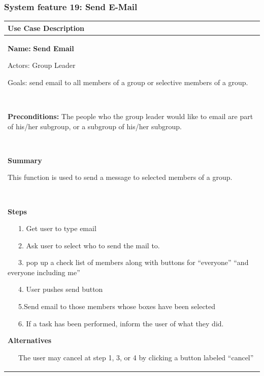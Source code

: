 \documentclass[letterpaper]{article}
\newcommand\textstyleDefaultParagraphFont[1]{#1}
\begin{document}
\subsubsection[System feature 19: Send E{}-Mail]{\rmfamily System
feature 19: Send E-Mail}
\begin{flushleft}
\tablehead{}
\begin{supertabular}{|m{6.42126in}|}
\hline
\bfseries\color{black} Use Case Description\\\hline
{\color{black} \textstyleDefaultParagraphFont{\textbf{Name:
}}\textstyleDefaultParagraphFont{\textsf{\textbf{Send Email}}}}

{\color{black} Actors: Group Leader}

{\color{black} Goals: send email to all members of a group or selective
members of a group.}

~

{\color{black} \textstyleDefaultParagraphFont{\textbf{Preconditions:}}
The people who the group leader would like to email are part of his/her
subgroup, or a subgroup of his/her subgroup.}

~

{\bfseries\color{black} Summary}

{\color{black} This function is used to send a message to selected
members of a group.}

~

{\bfseries\color{black} Steps}

{\color{black} \ \ \ 1. Get user to type email}

{\color{black} \ \ \ 2. Ask user to select who to send the mail to. }

{\color{black} \ \ \ 3. pop up a check list of members along with
buttons for {\textquotedblleft}everyone{\textquotedblright}
{\textquotedblleft}and everyone including me{\textquotedblright}}

{\color{black} \ \ \ 4. User pushes send button}

{\color{black} \ \ \ 5.Send email to those members whose boxes have been
selected}

{\color{black} \ \ \ 6. If a task has been performed, inform the user of
what they did.}

{\bfseries\color{black} Alternatives}

\color{black} \ \ \ The user may cancel at step 1, 3, or 4 by clicking a
button labeled {\textquotedblleft}cancel{\textquotedblright}\\\hline
\end{supertabular}
\end{flushleft}
\end{document}
